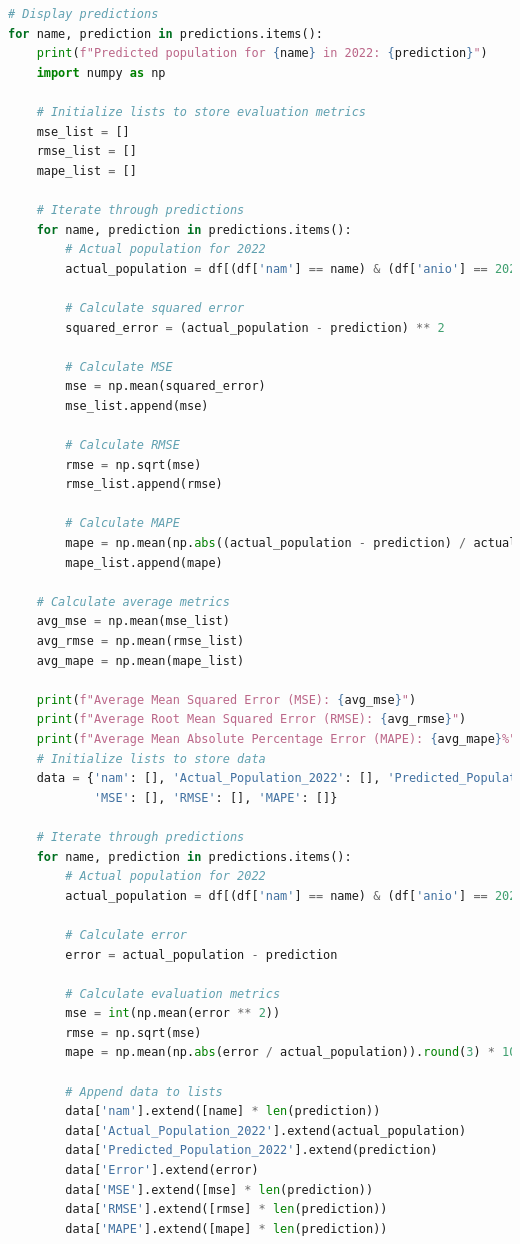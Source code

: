 \documentclass{article}
\theoremstyle{mytheoremstyle}
\theoremstyle{mytheoremstyle}
\theoremstyle{myproblemstyle}
\begin{document}
\begin{lstlisting}[language=Python, caption=RegTrees.ipynb,label={lst:LR.ipynb}]
# Display predictions
for name, prediction in predictions.items():
    print(f"Predicted population for {name} in 2022: {prediction}")
    import numpy as np

    # Initialize lists to store evaluation metrics
    mse_list = []
    rmse_list = []
    mape_list = []
    
    # Iterate through predictions
    for name, prediction in predictions.items():
        # Actual population for 2022
        actual_population = df[(df['nam'] == name) & (df['anio'] == 2022)]['pob'].values[0]
        
        # Calculate squared error
        squared_error = (actual_population - prediction) ** 2
        
        # Calculate MSE
        mse = np.mean(squared_error)
        mse_list.append(mse)
        
        # Calculate RMSE
        rmse = np.sqrt(mse)
        rmse_list.append(rmse)
        
        # Calculate MAPE
        mape = np.mean(np.abs((actual_population - prediction) / actual_population)) * 100
        mape_list.append(mape)
    
    # Calculate average metrics
    avg_mse = np.mean(mse_list)
    avg_rmse = np.mean(rmse_list)
    avg_mape = np.mean(mape_list)
    
    print(f"Average Mean Squared Error (MSE): {avg_mse}")
    print(f"Average Root Mean Squared Error (RMSE): {avg_rmse}")
    print(f"Average Mean Absolute Percentage Error (MAPE): {avg_mape}%")
    # Initialize lists to store data
    data = {'nam': [], 'Actual_Population_2022': [], 'Predicted_Population_2022': [], 'Error': [],
            'MSE': [], 'RMSE': [], 'MAPE': []}
    
    # Iterate through predictions
    for name, prediction in predictions.items():
        # Actual population for 2022
        actual_population = df[(df['nam'] == name) & (df['anio'] == 2022)]['pob'].values
        
        # Calculate error
        error = actual_population - prediction
        
        # Calculate evaluation metrics
        mse = int(np.mean(error ** 2))
        rmse = np.sqrt(mse)
        mape = np.mean(np.abs(error / actual_population)).round(3) * 100
        
        # Append data to lists
        data['nam'].extend([name] * len(prediction))
        data['Actual_Population_2022'].extend(actual_population)
        data['Predicted_Population_2022'].extend(prediction)
        data['Error'].extend(error)
        data['MSE'].extend([mse] * len(prediction))
        data['RMSE'].extend([rmse] * len(prediction))
        data['MAPE'].extend([mape] * len(prediction))
    

\end{lstlisting}
\end{document}
